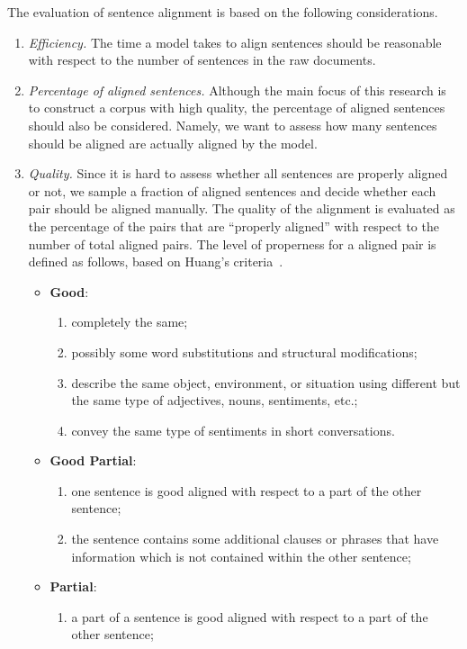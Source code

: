 The evaluation of sentence alignment is based on the following considerations.
\begin{enumerate}
	\item \emph{Efficiency.} The time a model takes to align sentences should be reasonable with respect to the number of sentences in the raw documents.
	\item \emph{Percentage of aligned sentences.} Although the main focus of this research is to construct a corpus with high quality, the percentage of aligned sentences should also be considered. Namely, we want to assess how many sentences should be aligned are actually aligned by the model.
	\item \emph{Quality.} Since it is hard to assess whether all sentences are properly aligned or not, we sample a fraction of aligned sentences and decide whether each pair should be aligned manually. The quality of the alignment is evaluated as the percentage of the pairs that are ``properly aligned'' with respect to the number of total aligned pairs. The level of properness for a aligned pair is defined as follows, based on Huang's criteria~\cite{hwang2015aligning}.
	\begin{itemize}
		\item \textbf{Good}: 
		\begin{enumerate}
			\item completely the same;
			\item possibly some word substitutions and structural modifications;
			\item describe the same object, environment, or situation using different but the same type of adjectives, nouns, sentiments, etc.;
			\item convey the same type of sentiments in short conversations.
		\end{enumerate}
		\item \textbf{Good Partial}:
		\begin{enumerate}
			\item one sentence is good aligned with respect to a part of the other sentence;
			\item the sentence contains some additional clauses or phrases that have information which is not contained within the other sentence;
		\end{enumerate}
		\item \textbf{Partial}:
		\begin{enumerate}
			\item a part of a sentence is good aligned with respect to a part of the other sentence;

\end{enumerate}
\end{itemize}
\end{enumerate}
